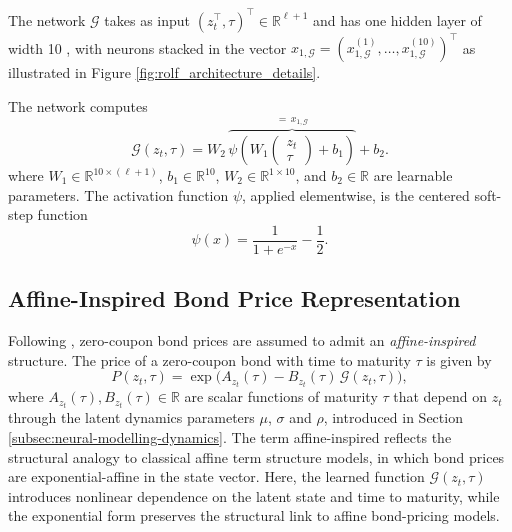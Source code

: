 

The network $\mathcal{G}$ takes as input $(z_t^\top,\tau)^\top\in\mathbb{R}^{\ell+1}$ and has one hidden layer of width 10 \citep{MatinWanPoulsen2025}, with neurons stacked in the vector $x_{1,\mathcal{G}}=\left(x_{1,\mathcal{G}}^{(1)},\ldots,x_{1,\mathcal{G}}^{(10)}\right)^\top$ as illustrated in Figure \ref{fig:rolf_architecture_details}.

The network computes
\[
\mathcal{G}(z_t,\tau) = W_2\, \overbrace{\psi\!\left(W_1\begin{pmatrix}z_t\\\tau\end{pmatrix} + b_1\right)}^{=\,x_{1,\mathcal{G}}} + b_2.
\]
where \(W_1\in\mathbb{R}^{10\times(\ell+1)}\),
\(b_1\in\mathbb{R}^{10}\), \(W_2\in\mathbb{R}^{1\times 10}\), and
\(b_2\in\mathbb{R}\) are learnable parameters. The activation function \(\psi\), applied elementwise, is the centered soft-step function
\begin{equation}
\psi(x)=\frac{1}{1+e^{-x}}-\frac{1}{2}.
\label{eq:activation}
\end{equation}

\subsection{Affine-Inspired Bond Price Representation}

Following \citet{MatinWanPoulsen2025}, zero-coupon bond prices are assumed to admit an \textit{affine-inspired} structure. The price of a zero-coupon bond with time to maturity $\tau$ is given by
\begin{equation}
P(z_t,\tau)
=
\exp\!\Big(A_{z_t}(\tau)-B_{z_t}(\tau)\,\mathcal{G}(z_t,\tau)\Big),
\label{affineinspiredzcbprices}
\end{equation}
where $A_{z_t}(\tau),B_{z_t}(\tau)\in\mathbb{R}$ are scalar functions of maturity $\tau$ that depend on $z_t$ through the latent dynamics parameters $\mu$, $\sigma$ and $\rho$, introduced in Section \ref{subsec:neural-modelling-dynamics}. The term affine-inspired reflects the structural analogy to classical affine term structure models, in which bond prices are exponential-affine in the state vector. Here, the learned function $\mathcal{G}(z_t,\tau)$ introduces nonlinear dependence on the latent state and time to maturity, while the exponential form preserves the structural link to affine bond-pricing models.

